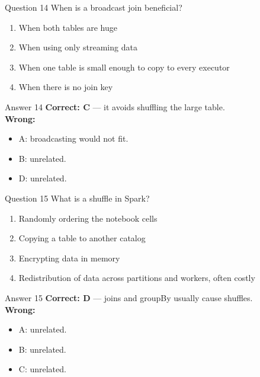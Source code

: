 \documentclass[aspectratio=169,11pt]{beamer}
\begin{document}
\begin{frame}{Question 14}
When is a broadcast join beneficial?
\begin{enumerate}[label=\Alph*.]
\item When both tables are huge
\item When using only streaming data
\item When one table is small enough to copy to every executor
\item When there is no join key
\end{enumerate}
\end{frame}
\begin{frame}{Answer 14}
\textbf{Correct: C} --- it avoids shuffling the large table.\\
\vspace{0.5em}
\textbf{Wrong:}
\begin{itemize}
\item A: broadcasting would not fit.
\item B: unrelated.
\item D: unrelated.
\end{itemize}
\end{frame}

\begin{frame}{Question 15}
What is a shuffle in Spark?
\begin{enumerate}[label=\Alph*.]
\item Randomly ordering the notebook cells
\item Copying a table to another catalog
\item Encrypting data in memory
\item Redistribution of data across partitions and workers, often costly
\end{enumerate}
\end{frame}
\begin{frame}{Answer 15}
\textbf{Correct: D} --- joins and groupBy usually cause shuffles.\\
\vspace{0.5em}
\textbf{Wrong:}
\begin{itemize}
\item A: unrelated.
\item B: unrelated.
\item C: unrelated.
\end{itemize}
\end{frame}
\end{document}
